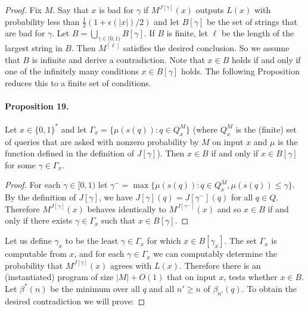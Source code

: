 \begin{proof}
Fix $M$. Say that $x$ is bad for $\gamma$ if $M^{J[\gamma]}(x)$ outputs $L(x)$ with probability less than $\frac12(1+\epsilon(|x|)/2)$ and let $B[\gamma]$ be the set of strings that are bad for $\gamma$. Let $B=\bigcup_{\gamma\in[0,1)}B[\gamma]$.
If $B$ is finite, let $\ell$ be the length of the largest string in $B$. Then $M^{[\ell]}$ satisfies the desired conclusion. So we assume that $B$ is infinite and derive a contradiction.
Note that $x\in B$ holds if and only if one of the infinitely many conditions $x\in B[\gamma]$ holds. The following Proposition reduces this to a finite set of conditions.
\paragraph{Proposition 19.}
Let $x\in\{0,1\}^*$ and let $\Gamma_x=\{\mu(s(q)):q\in Q_x^M\}$ (where $Q_x^M$ is the (finite) set of queries that are asked with nonzero probability by $M$ on input $x$ and $\mu$ is the function defined in the definition of $J[\gamma]$). Then $x\in B$ if and only if $x\in B[\gamma]$ for some $\gamma\in\Gamma_x$.
\begin{proof}
For each $\gamma\in[0,1)$ let $\gamma^-=\max\{\mu(s(q)):q\in Q_x^M,\mu(s(q))\leq\gamma\}$. By the definition of $J[\gamma]$, we have $J[\gamma](q)=J[\gamma^-](q)$ for all $q\in Q$. Therefore $M^{J[\gamma]}(x)$ behaves identically to $M^{J[\gamma^-]}(x)$ and so $x\in B$ if and only if there exists $\gamma\in\Gamma_x$ such that $x\in B[\gamma]$.
\end{proof}
Let us define $\gamma_x$ to be the least $\gamma\in\Gamma_x$ for which $x\in B[\gamma_x]$.
The set $\Gamma_x$ is computable from $x$, and for each $\gamma\in\Gamma_x$ we can computably determine the probability that $M^{J[\gamma]}(x)$ agrees with $L(x)$. Therefore there is an (instantiated) program of size $|M|+O(1)$ that on input $x$, tests whether $x\in B$.
Let $\beta^*(n)$ be the minimum over all $q$ and all $n'\geq n$ of $\beta_{n'}(q)$. To obtain the desired contradiction we will prove:

\end{proof}
